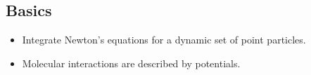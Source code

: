 \documentclass[
paper=128mm:96mm, %
fontsize=11pt, %
pagesize, %
parskip=half-, %
]{scrartcl} %
\theoremstyle{mythmstyle} %
\begin{document}
\subsection{Basics}
\clearpage



\begin{itemize}
 \item Integrate Newton's equations for a dynamic set of point particles.
 \item Molecular interactions are described by potentials.
\end{itemize}

\begin{center}
\end{center}

\clearpage


\begin{center}
\end{center}
\end{document}
